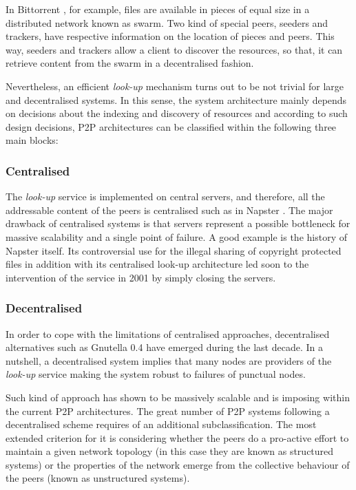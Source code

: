 In Bittorrent \cite{bittorrent:understanding}, for example, files are available in pieces of equal size in a distributed network known as swarm. Two kind of special peers, seeders and trackers, have respective information on the location of pieces and peers. This way, seeders and trackers allow a client to discover the resources, so that, it can retrieve content from the swarm in a decentralised fashion. 

Nevertheless, an efficient {\em look-up} mechanism turns out to be not trivial for large and decentralised systems. In this sense, the system architecture mainly depends on decisions about the indexing and discovery of resources and according to such design decisions, P2P architectures can be classified within the following three main blocks:


\subsubsection{Centralised}

    The \emph{look-up} service is implemented on central servers, and therefore, all the addressable content of the peers is centralised such as in Napster \cite{napstervsgnutella}. The major drawback of centralised systems is that servers represent a possible bottleneck for massive scalability and a single point of failure. A good example is the history of Napster itself. Its controversial use for the illegal sharing of copyright protected files in addition with its centralised look-up architecture led soon to the intervention of the service in 2001 by simply closing the servers. 

\subsubsection{Decentralised}
    
    In order to cope with the limitations of centralised approaches, decentralised alternatives such as Gnutella 0.4 \cite{gnutella04} have emerged during the last decade. In a nutshell, a decentralised system implies that many nodes are providers of the \emph{look-up} service making the system robust to failures of punctual nodes.

    Such kind of approach has shown to be massively scalable and is imposing within the current P2P architectures. The great number of P2P systems following a decentralised scheme requires of an additional subclassification. The most extended criterion for it is considering whether the peers do a pro-active effort to maintain a given network topology (in this case they are known as structured systems) or the properties of the network emerge from the collective behaviour of the peers (known as unstructured systems).

